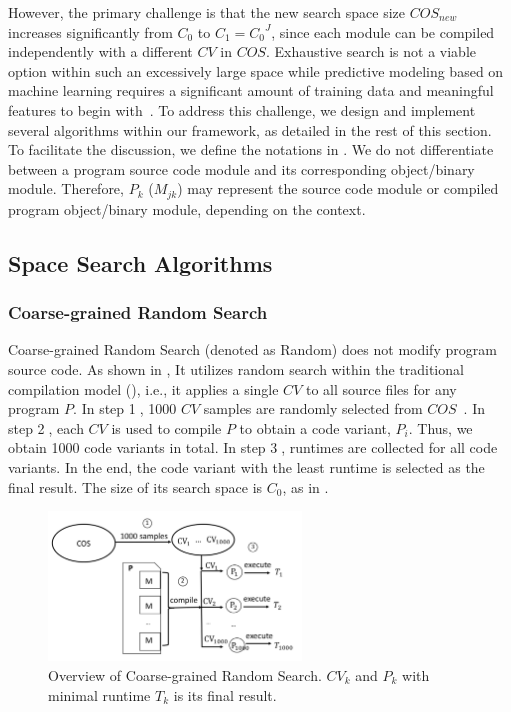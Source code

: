 However, the primary challenge is that the new search space size
$COS_{new}$ increases significantly from $C_0$ to $C_1={C_0}^J$, since
each module can be compiled independently with a different $CV$ in
$COS$.  Exhaustive search is not a viable option within such an
excessively large space while predictive modeling based on machine
learning requires a significant amount of training data and meaningful
features to begin with~\cite{FursinMGL15}. To address this challenge, we design and implement
several algorithms within our framework, as detailed in the rest of this
section.  To facilitate the discussion, we define the notations
in . We do not differentiate between a program source code
    module and its corresponding object/binary module. Therefore,
    $P_k$ ($M_{jk}$) may represent the source code module or compiled
    program object/binary module, depending on the context.

\subsection{Space Search Algorithms}

\subsubsection{Coarse-grained Random Search}

Coarse-grained Random Search (denoted as Random) does not modify program
source code. As shown in
, It utilizes random search within the traditional
compilation model (), i.e., it applies a single $CV$ to
all source files for any program $P$.  In step \textcircled{1}, 1000
$CV$ samples are randomly selected from $COS$~\cite{opentuner}.  In
step \textcircled{2}, each $CV$ is used to compile $P$ to obtain a
code variant, $P_i$.  Thus, we obtain 1000 code variants in total.  In
step \textcircled{3}, runtimes are collected for all code variants.
In the end, the code variant with the least runtime is selected as the final result.
The size of its search space is
$C_0$, as in .
\begin{figure}
\centering
\includegraphics[width=0.6\textwidth]{figures/r_origin}
\vspace{-4mm}
\caption{Overview of Coarse-grained Random Search. $CV_k$ and $P_k$
  with minimal runtime $T_k$ is its final result.}
\label{fig:csr}
\vspace{-4mm}
\end{figure}
